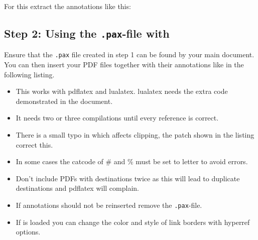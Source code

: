 \documentclass[DIV=12,parskip=half-,bibliography=totoc]{scrartcl}
\begin{document}
For this extract the annotations like this:



\subsection{Step 2: Using the \texttt{.pax}-file with }

Ensure that the \texttt{.pax} file created in step 1 can be found by your main document. You can then insert your PDF files together with their annotations like in the following listing.

\begin{itemize}
\item This works with pdflatex and lualatex. lualatex needs the extra code demonstrated in the document.
\item It needs two or three compilations until every reference is correct.
\item There is a small typo in  which affects clipping, the patch shown in the listing correct this.
\item In some cases the catcode of \# and \% must be set to letter to avoid errors.
\item Don't include PDFs with destinations twice as this will lead to duplicate destinations and pdflatex will complain.
\item If annotations should not be reinserted remove the \texttt{.pax}-file.
\item If  is loaded you can change the color and style of link borders with hyperref options.
\end{itemize}
\enlargethispage{\baselineskip}

\end{document}
